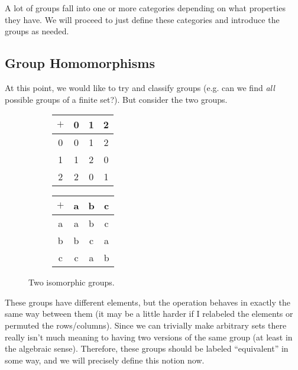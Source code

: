   A lot of groups fall into one or more categories depending on what properties they have. We will proceed to just define these categories and introduce the groups as needed. 

\subsection{Group Homomorphisms}

  At this point, we would like to try and classify groups (e.g. can we find \textit{all} possible groups of a finite set?). But consider the two groups. 

  \begin{figure}[H]
    \centering
    \begin{subfigure}[b]{0.48\textwidth}
      \centering
      \begin{tabular}{c|ccc}
        \hline
        $+$ & 0 & 1 & 2 \\
        \hline
        0 & 0 & 1 & 2 \\
        1 & 1 & 2 & 0 \\
        2 & 2 & 0 & 1 \\
        \hline
      \end{tabular}
    \end{subfigure}
    \hfill 
    \begin{subfigure}[b]{0.48\textwidth}
      \centering
      \begin{tabular}{c|ccc}
        \hline
        $+$ & a & b & c \\
        \hline
        a & a & b & c \\
        b & b & c & a \\
        c & c & a & b \\
        \hline
      \end{tabular}
    \end{subfigure}
    \caption{Two isomorphic groups.}
  \end{figure} 

  These groups have different elements, but the operation behaves in exactly the same way between them (it may be a little harder if I relabeled the elements or permuted the rows/columns). Since we can trivially make arbitrary sets there really isn't much meaning to having two versions of the same group (at least in the algebraic sense). Therefore, these groups should be labeled ``equivalent'' in some way, and we will precisely define this notion now. 

